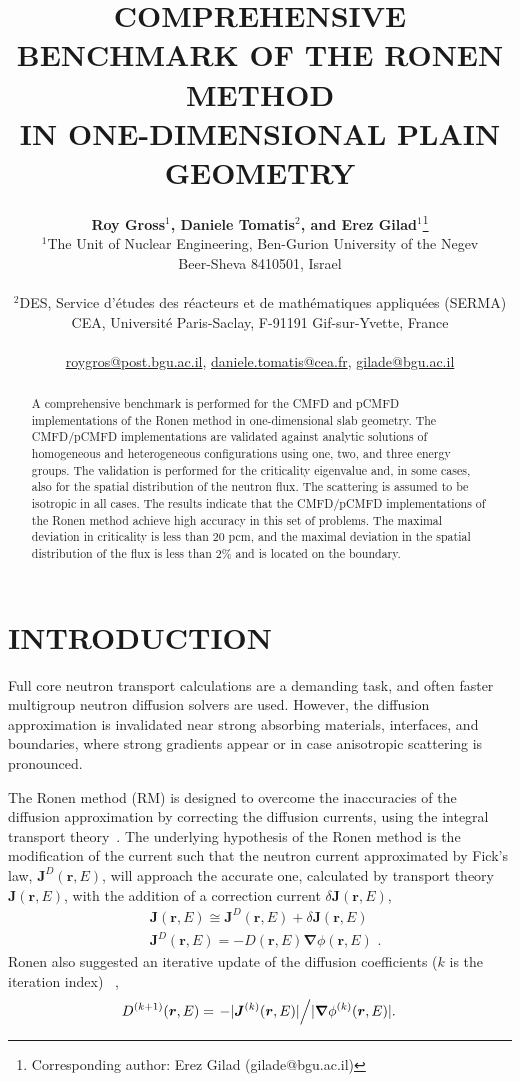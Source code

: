 \documentclass[letterpaper]{mc2021}
\title{COMPREHENSIVE BENCHMARK OF THE RONEN METHOD\\IN ONE-DIMENSIONAL PLAIN GEOMETRY}
\author{%
  \textbf{Roy Gross$^1$, Daniele Tomatis$^2$, and Erez Gilad$^1$}\footnote{Corresponding author: Erez Gilad (gilade@bgu.ac.il)} \\
  $^1$The Unit of Nuclear Engineering, Ben-Gurion University of the Negev\\ Beer-Sheva 8410501, Israel\\
\\
  $^2$DES, Service d'{\'e}tudes des r\'eacteurs et de math\'ematiques appliqu\'ees (SERMA)\\
  CEA, Universit\'e Paris-Saclay, F-91191 Gif-sur-Yvette, France\\ 
\\
  \url{roygros@post.bgu.ac.il}, \url{daniele.tomatis@cea.fr}, \url{gilade@bgu.ac.il}
}
\newcommand{\rr}{\bm{r}}
\newcommand{\rE}{\ensuremath{(\rr,E)}}
\newcommand{\bnabla}{\ensuremath{\bm{\nabla}}}
\begin{document}
\maketitle
\justify 

\begin{abstract}
  A comprehensive benchmark is performed for the CMFD and pCMFD implementations of the Ronen method in one-dimensional slab geometry. The CMFD/pCMFD implementations are validated against analytic solutions of homogeneous and heterogeneous configurations using one, two, and three energy groups. The validation is performed for the criticality eigenvalue and, in some cases, also for the spatial distribution of the neutron flux. The scattering is assumed to be isotropic in all cases. The results indicate that the CMFD/pCMFD implementations of the Ronen method achieve high accuracy in this set of problems. The maximal deviation in criticality is less than 20 pcm, and the maximal deviation in the spatial distribution of the flux is less than 2\% and is located on the boundary.  
\end{abstract}

\section{INTRODUCTION} 
\label{sec:intro}

Full core neutron transport calculations are a demanding task, and often faster multigroup neutron diffusion solvers are used. However, the diffusion approximation is invalidated near strong absorbing materials, interfaces, and boundaries, where strong gradients appear or in case anisotropic scattering is pronounced. 

\vspace{-1.5mm}

The Ronen method (RM) is designed to overcome the inaccuracies of the diffusion approximation by correcting the diffusion currents, using the integral transport theory~\cite{Tomatis-2011,Gross-2020,Tomatis-2020}. The underlying hypothesis of the Ronen method is the modification of the current such that the neutron current approximated by Fick's law, $\bm{J}^D\rE$, will approach the accurate one, calculated by transport theory $\bm{J}\rE$, with the addition of a correction current $\delta\bm{J}\rE$,
\begin{align}
\label{eq:Fick}
& \bm{J}\rE \cong \bm{J}^D\rE + \delta\bm{J}\rE \\ 
& \bm{J}^D\rE = -D\rE\bnabla\phi\rE  \,\,.
\end{align}
Ronen also suggested an iterative update of the diffusion coefficients ($k$ is the iteration index) ~\cite{Ronen-2004},
\begin{equation}
\label{eq:RM-it}
D^{(k+1)}\rE = \left. - \lvert \bm{J}^{(k)}\rE \rvert \middle/ \lvert \bnabla \phi^{(k)}\rE \rvert. \right.
\end{equation}
\end{document}
